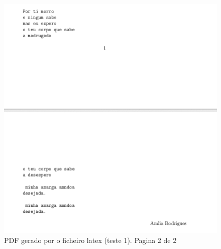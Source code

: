 \begin{figure}
\includegraphics[width=15cm]{anexos/2-5-a-img2.png}
\caption{PDF gerado por o ficheiro latex (teste 1). Pagina 2 de 2}
\label{fig::anex-music-test-img}
\end{figure}

